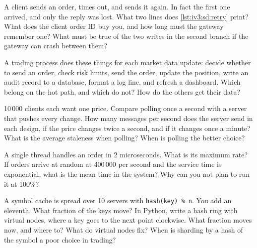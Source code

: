\begin{question}\label{iq:iv3:system-design:5}
A client sends an order, times out, and sends it again. In fact the first one arrived, and only the reply was lost. What two lines does \cref{lst:iv3:sd:retry} print? What does the client order ID buy you, and how long must the gateway remember one? What must be true of the two writes in the second branch if the gateway can crash between them?
\label{lst:iv3:sd:retry}
\end{question}

\begin{question}\label{iq:iv3:system-design:6}
A trading process does these things for each market data update: decide whether to send an order, check risk limits, send the order, update the position, write an audit record to a database, format a log line, and refresh a dashboard. Which belong on the hot path, and which do not? How do the others get their data?
\end{question}

\begin{question}\label{iq:iv3:system-design:7}
10\,000 clients each want one price. Compare polling once a second with a server that pushes every change. How many messages per second does the server send in each design, if the price changes twice a second, and if it changes once a minute? What is the average staleness when polling? When is polling the better choice?
\end{question}

\begin{question}\label{iq:iv3:system-design:8}
A single thread handles an order in 2 microseconds. What is its maximum rate? If orders arrive at random at 400\,000 per second and the service time is exponential, what is the mean time in the system? Why can you not plan to run it at 100\%?
\end{question}

\begin{question}\label{iq:iv3:system-design:9}
A symbol cache is spread over 10 servers with \texttt{hash(key) \% n}. You add an eleventh. What fraction of the keys move? In Python, write a hash ring with virtual nodes, where a key goes to the next point clockwise. What fraction moves now, and where to? What do virtual nodes fix? When is sharding by a hash of the symbol a poor choice in trading?
\end{question}

